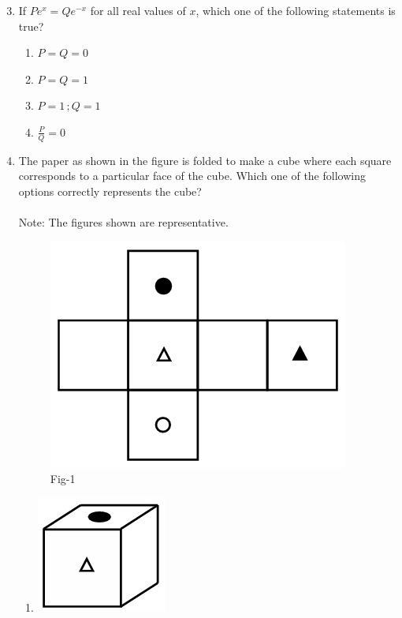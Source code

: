 \documentclass[journal]{IEEEtran}
\theoremstyle{remark}
\begin{document}
\begin{enumerate}[itemsep=1em]
\setcounter{enumi}{2}
\item If $Pe^x=Qe^{-x}$ for all real values of $x$, which one of the following statements is true?
\begin{multicols}{4}
\begin{enumerate}
    \item $P=Q=0$
    \item $P=Q=1$
    \item $P=1\,;Q=1$
    \item $\frac{P}{Q}=0$
\end{enumerate}
\end{multicols}
\end{enumerate}

\begin{enumerate}[itemsep=1em]
\setcounter{enumi}{3}
\item The paper as shown in the figure is folded to make a cube where each square corresponds to a particular face of the cube. Which one of the following options correctly represents the cube?\\
\\
Note: The figures shown are representative.
\begin{figure}[H]
    \centering
    \includegraphics[width=0.2\columnwidth]{figs/fig-1.jpeg}
    \caption*{Fig-1}
    \label{fig:1}
\end{figure}
\newpage
\vspace*{0.25cm}
\begin{multicols}{4}
\begin{enumerate}
    \item \begin{minipage}[t]{0.2\textwidth}
    \vspace{0pt}
        \includegraphics[width=\columnwidth]{figs/fig-2.jpeg}

\end{minipage}
\end{enumerate}
\end{multicols}
\end{enumerate}
\end{document}
